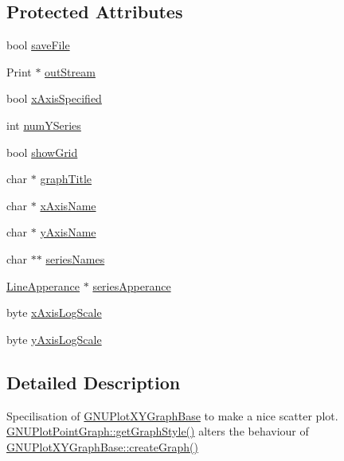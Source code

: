 \subsection*{Protected Attributes}
\begin{DoxyCompactItemize}
\item 
bool \hyperlink{class_serial_graph_a24202e0a7a8bac5ec1cfd92bf796e078}{save\+File}
\item 
Print $\ast$ \hyperlink{class_serial_graph_aec32289a9393e98bf80d44406e5c207d}{out\+Stream}
\item 
bool \hyperlink{class_serial_graph_a4dbd9cf190c591fb4f2f46a50d937199}{x\+Axis\+Specified}
\item 
int \hyperlink{class_serial_graph_ab40c430e06102b9624736173d4a58596}{num\+Y\+Series}
\item 
bool \hyperlink{class_serial_graph_ad61d5ea29eacc1611c5addc94714f1e2}{show\+Grid}
\item 
char $\ast$ \hyperlink{class_serial_graph_a0b33d43c2bb54340ef1f90b5f76d7aea}{graph\+Title}
\item 
char $\ast$ \hyperlink{class_serial_graph_a5f5bf85ed361ff567d0888eaa73e269c}{x\+Axis\+Name}
\item 
char $\ast$ \hyperlink{class_serial_graph_a08452a56c74ec5f5473b64605d555339}{y\+Axis\+Name}
\item 
char $\ast$$\ast$ \hyperlink{class_serial_graph_a2307e40e27249f44bbe14776dc68c561}{series\+Names}
\item 
\hyperlink{struct_line_apperance}{Line\+Apperance} $\ast$ \hyperlink{class_serial_graph_a8d743f9eeeca69a988d2159a405e4253}{series\+Apperance}
\item 
byte \hyperlink{class_serial_graph_afc2ca72fdfe2bc5e3159c9e910a8f81e}{x\+Axis\+Log\+Scale}
\item 
byte \hyperlink{class_serial_graph_a1f0424857ec14c176747b3ddb0768eee}{y\+Axis\+Log\+Scale}
\end{DoxyCompactItemize}


\subsection{Detailed Description}
Specilisation of \hyperlink{class_g_n_u_plot_x_y_graph_base}{G\+N\+U\+Plot\+X\+Y\+Graph\+Base} to make a nice scatter plot. \hyperlink{class_g_n_u_plot_point_graph_aeeae395426112202d3617ff66d836c99}{G\+N\+U\+Plot\+Point\+Graph\+::get\+Graph\+Style()} alters the behaviour of \hyperlink{class_g_n_u_plot_x_y_graph_base_a8389f830ff330dfb705e00d31053e130}{G\+N\+U\+Plot\+X\+Y\+Graph\+Base\+::create\+Graph()} 

